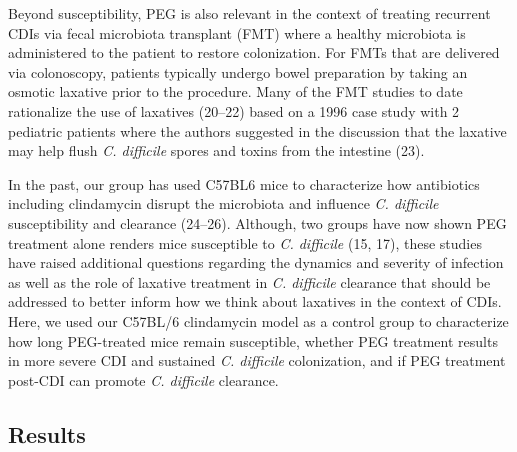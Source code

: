 \documentclass[
  11pt,
]{article}
\begin{document}
Beyond susceptibility, PEG is also relevant in the context of treating
recurrent CDIs via fecal microbiota transplant (FMT) where a healthy
microbiota is administered to the patient to restore colonization. For
FMTs that are delivered via colonoscopy, patients typically undergo
bowel preparation by taking an osmotic laxative prior to the procedure.
Many of the FMT studies to date rationalize the use of laxatives
(20--22) based on a 1996 case study with 2 pediatric patients where the
authors suggested in the discussion that the laxative may help flush
\emph{C. difficile} spores and toxins from the intestine (23).

In the past, our group has used C57BL6 mice to characterize how
antibiotics including clindamycin disrupt the microbiota and influence
\emph{C. difficile} susceptibility and clearance (24--26). Although, two
groups have now shown PEG treatment alone renders mice susceptible to
\emph{C. difficile} (15, 17), these studies have raised additional
questions regarding the dynamics and severity of infection as well as
the role of laxative treatment in \emph{C. difficile} clearance that
should be addressed to better inform how we think about laxatives in the
context of CDIs. Here, we used our C57BL/6 clindamycin model as a
control group to characterize how long PEG-treated mice remain
susceptible, whether PEG treatment results in more severe CDI and
sustained \emph{C. difficile} colonization, and if PEG treatment
post-CDI can promote \emph{C. difficile} clearance.

\hypertarget{results}{%
\subsection{Results}\label{results}}
\end{document}
